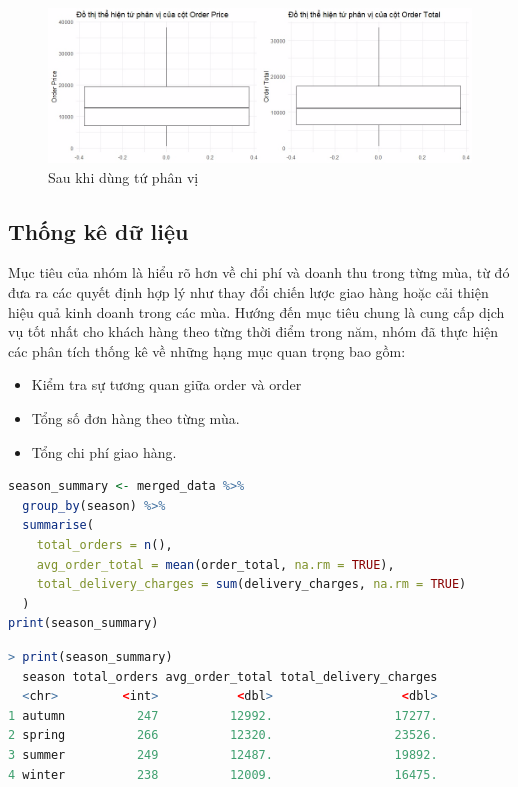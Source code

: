 \begin{figure}[!ht]
    \centering \includegraphics[width=15cm]{Images/img/4.2_remove_outlier/tu_phan_vi.jpg}
    \caption{Sau khi dùng tứ phân vị}
\end{figure}
\subsection{Thống kê dữ liệu}
Mục tiêu của nhóm là hiểu rõ hơn về chi phí và doanh thu trong từng mùa, từ đó đưa ra các quyết định hợp lý như thay đổi chiến lược giao hàng hoặc cải thiện hiệu quả kinh doanh trong các mùa. Hướng đến mục tiêu chung là cung cấp dịch vụ tốt nhất cho khách hàng theo từng thời điểm trong năm, nhóm đã thực hiện các phân tích thống kê về những hạng mục quan trọng bao gồm:

\begin{itemize}
    \item Kiểm tra sự tương quan giữa order và order 
    \item Tổng số đơn hàng theo từng mùa.
    \item Tổng chi phí giao hàng.
    
\end{itemize}

\begin{lstlisting}[language=R, caption=Thống kê]
season_summary <- merged_data %>%
  group_by(season) %>%
  summarise(
    total_orders = n(),
    avg_order_total = mean(order_total, na.rm = TRUE),
    total_delivery_charges = sum(delivery_charges, na.rm = TRUE)
  )
print(season_summary)

\end{lstlisting}
\begin{lstlisting}[language=R, caption=Thông số từng hạng mục theo mùa]
> print(season_summary)
  season total_orders avg_order_total total_delivery_charges
  <chr>         <int>           <dbl>                  <dbl>
1 autumn          247          12992.                 17277.
2 spring          266          12320.                 23526.
3 summer          249          12487.                 19892.
4 winter          238          12009.                 16475.
\end{lstlisting}
